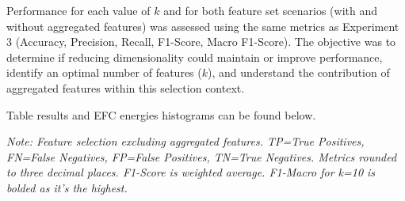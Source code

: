 \documentclass[12pt]{article}
\begin{document}
Performance for each value of $k$ and for both feature set scenarios (with and without aggregated features) was assessed
using the same metrics as Experiment 3 (Accuracy, Precision, Recall, F1-Score, Macro F1-Score). The objective was to
determine if reducing dimensionality could maintain or improve performance, identify an optimal number of features ($k$),
and understand the contribution of aggregated features within this selection context.

Table results and EFC energies histograms can be found below.

\begin{table}[htbp] %
  \centering
  \caption{EFC Performance with Feature Selection (Aggregated Features Excluded) for Varying k (Experiment 2a).}
  \label{tab:fs_excluded_agg_results}
  \par\medskip
  \footnotesize
  \textit{Note: Feature selection excluding aggregated features. TP=True Positives, FN=False Negatives, FP=False Positives,
  TN=True Negatives. Metrics rounded to three decimal places. F1-Score is weighted average. F1-Macro for k=10 is bolded
  as it's the highest.}
\end{table}
\end{document}
